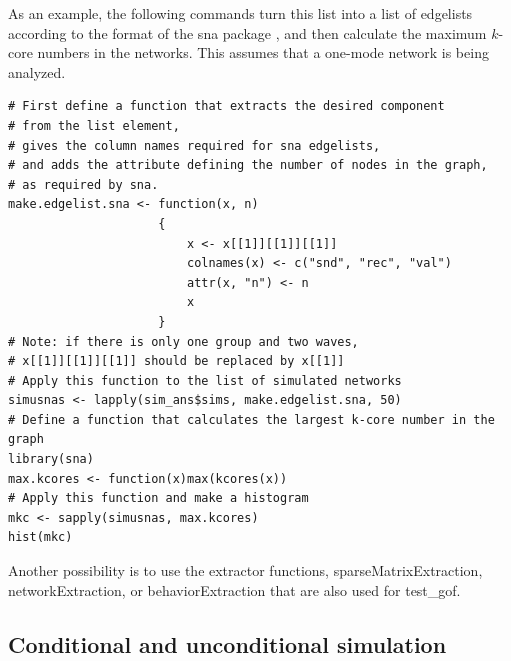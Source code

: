 \documentclass[a4paper,fleqn,11pt]{article}
\newcommand{\+}{\, + \,}
\newcommand{\sfn}[1]{\textsf{#1}}
\begin{document}
As an example, the following commands turn this list into
a list of edgelists according to the format of the \textsf{sna} package
\citep{Butts08}, and then calculate the maximum $k$-core numbers
in the networks.
This assumes that a one-mode network is being analyzed.
\begin{verbatim}
# First define a function that extracts the desired component
# from the list element,
# gives the column names required for sna edgelists,
# and adds the attribute defining the number of nodes in the graph,
# as required by sna.
make.edgelist.sna <- function(x, n)
                     {
                         x <- x[[1]][[1]][[1]]
                         colnames(x) <- c("snd", "rec", "val")
                         attr(x, "n") <- n
                         x
                     }
# Note: if there is only one group and two waves,
# x[[1]][[1]][[1]] should be replaced by x[[1]]
# Apply this function to the list of simulated networks
simusnas <- lapply(sim_ans$sims, make.edgelist.sna, 50)
# Define a function that calculates the largest k-core number in the graph
library(sna)
max.kcores <- function(x)max(kcores(x))
# Apply this function and make a histogram
mkc <- sapply(simusnas, max.kcores)
hist(mkc)
\end{verbatim}
\bigskip

Another possibility is to use the extractor functions,
\sfn{sparseMatrixExtraction}, \sfn{networkExtraction}, or \sfn{behaviorExtraction}
that are also used for \sfn{test\_gof}.

\subsection{Conditional and unconditional simulation}
\label{S_conds}
\end{document}
